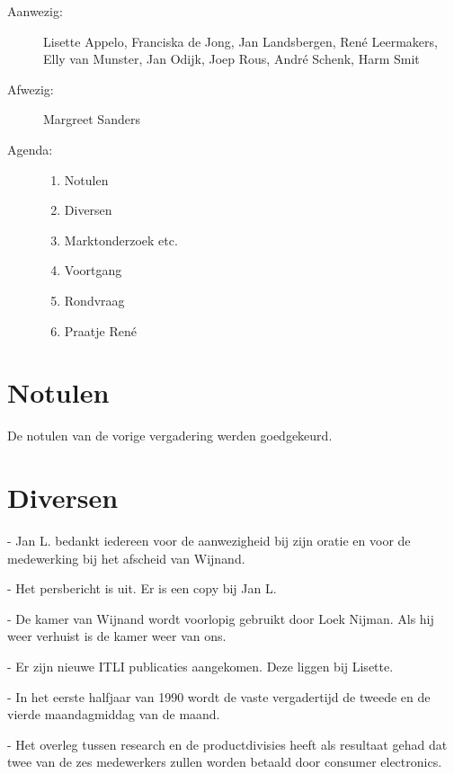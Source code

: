 

   \RosSupersedes{-}
   \MakeRosTitle
%
%
\begin{description}
\item[Aanwezig:] Lisette Appelo, Franciska de Jong, Jan Landsbergen, Ren\'{e}
                 Leermakers, Elly van Munster,
                 Jan Odijk, Joep Rous, 
                 Andr\'{e} Schenk,  Harm Smit
\item[Afwezig:] Margreet Sanders


\item[Agenda:]\mbox{}
  \begin{enumerate}
  \item Notulen
  \item Diversen
  \item Marktonderzoek etc.
  \item Voortgang
  \item Rondvraag
  \item Praatje Ren\'{e}
  \end{enumerate}
\end{description}

\section{Notulen}
De notulen van de vorige vergadering werden goedgekeurd. 

\section{Diversen}
- Jan L. bedankt iedereen voor de aanwezigheid bij zijn oratie en voor de 
medewerking bij het afscheid van Wijnand.

- Het persbericht is uit. Er is een copy bij Jan L.

- De kamer van Wijnand wordt voorlopig gebruikt door Loek Nijman. Als hij weer 
verhuist is de kamer weer van ons.

- Er zijn nieuwe ITLI publicaties aangekomen. Deze liggen bij Lisette.

- In het eerste halfjaar van 1990 wordt de vaste vergadertijd de tweede en de 
vierde maandagmiddag van de maand.

- Het overleg tussen research en de productdivisies heeft als resultaat gehad 
dat twee van de zes medewerkers zullen worden betaald door consumer
electronics.

